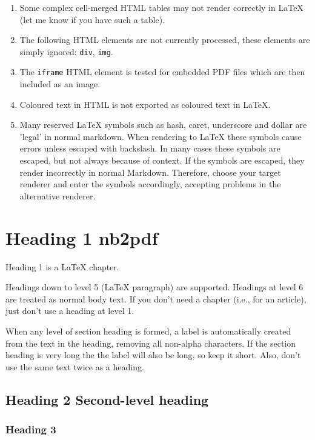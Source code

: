 \documentclass[english]{workpackage}[1996/06/02]
\begin{document}
\begin{enumerate}
\item Some complex cell-merged HTML tables may not render correctly in LaTeX (let me know if you have such a table).
\item The following HTML elements are not currently processed, these elements are simply ignored: \verb+div+,  \verb+img+.
\item The \verb+iframe+ HTML element is tested for embedded PDF files which are then included as an image.
\item Coloured text in HTML is not exported as coloured text in LaTeX.
\item Many reserved LaTeX symbols such as hash, caret, underscore and dollar are 'legal' in normal markdown.  When rendering to LaTeX these symbols cause errors unless escaped with backslash.  In many cases these symbols are escaped, but not always because of context.  If the symbols are escaped, they render incorrectly in normal Markdown. Therefore, choose your target renderer and enter the symbols accordingly, accepting problems in the alternative renderer.
\end{enumerate}



\chapter{Heading 1 nb2pdf}
\label{sec:Heading1nb2pdf}


Heading 1 is a \LaTeX{} chapter.


Headings down to level 5 (\LaTeX{} paragraph) are supported. 
Headings at level 6 are treated as normal body text.
If you don't need a chapter (i.e., for an article), just don't use a heading at level 1.


When any level of section heading is formed, a label is automatically created from the text in the heading, removing all non-alpha characters.  If the section heading is very long the the label will also be long, so keep it short. Also, don't use the same text twice as a heading.




\section{Heading 2 Second-level heading}
\label{sec:Heading2Secondlevelheading}



\subsection{Heading 3}
\label{sec:Heading3}
\end{document}
